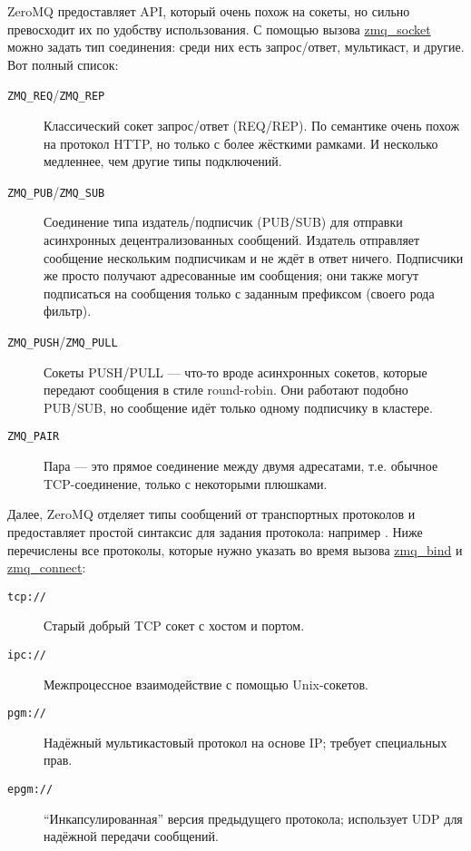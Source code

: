 ZeroMQ предоставляет API, который очень похож на сокеты, но сильно превосходит
их по удобству использования. С помощью вызова
\href{http://api.zeromq.org/zmq\_socket.html}{zmq\_socket} можно задать тип
соединения: среди них есть запрос/ответ, мультикаст, и другие. Вот полный
список:

\begin{description}
  \item [\texttt{ZMQ\_REQ}/\texttt{ZMQ\_REP}] Классический сокет запрос/ответ (REQ/REP).
    По семантике очень похож на протокол HTTP, но только с более жёсткими
    рамками. И несколько медленнее, чем другие типы подключений.

  \item [\texttt{ZMQ\_PUB}/\texttt{ZMQ\_SUB}] Соединение типа
    издатель/подписчик (PUB/SUB) для отправки асинхронных децентрализованных сообщений.
    Издатель отправляет сообщение нескольким подписчикам и не ждёт в ответ ничего.
    Подписчики же просто получают адресованные им сообщения; они также могут
    подписаться на сообщения только с заданным префиксом (своего рода фильтр).

  \item [\texttt{ZMQ\_PUSH}/\texttt{ZMQ\_PULL}] Сокеты PUSH/PULL --- что-то
    вроде асинхронных сокетов, которые передают сообщения в стиле round-robin.
    Они работают подобно PUB/SUB, но сообщение идёт только одному подписчику в
    кластере.

  \item [\texttt{ZMQ\_PAIR}] Пара --- это прямое соединение между двумя
    адресатами, т.е. обычное TCP-соединение, только с некоторыми плюшками.

\end{description}

Далее, ZeroMQ отделяет типы сообщений от транспортных протоколов и предоставляет
простой синтаксис для задания протокола: например .
Ниже перечислены все протоколы, которые нужно указать во время вызова
\href{http://api.zeromq.org/zmq\_bind.html}{zmq\_bind} и
\href{http://api.zeromq.org/zmq\_connect.html}{zmq\_connect}:

\begin{description}
\item [\texttt{tcp://}] Старый добрый TCP сокет с хостом и портом.
\item [\texttt{ipc://}] Межпроцессное взаимодействие с помощью Unix-сокетов.
\item [\texttt{pgm://}] Надёжный мультикастовый протокол на основе IP; требует
специальных прав.
\item [\texttt{epgm://}] ``Инкапсулированная'' версия предыдущего протокола;
использует UDP для надёжной передачи сообщений.
\end{description}

